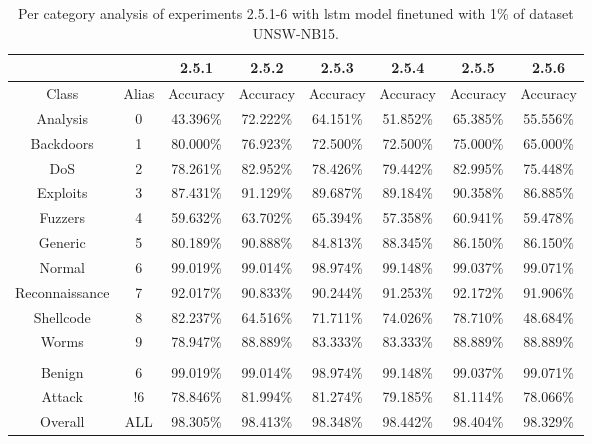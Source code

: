 \begin{table}[htb]
    \centering
    \begin{tabular}{@{}cccccccc@{}}
        \toprule
         &  & 2.5.1 & 2.5.2 & 2.5.3 & 2.5.4 & 2.5.5 & 2.5.6 \\
        \midrule
        Class &  Alias &  Accuracy &  Accuracy &  Accuracy &  Accuracy &  Accuracy &  Accuracy \\
        Analysis &  0 &  43.396\% &  72.222\% &  64.151\% &  51.852\% &  65.385\% &  55.556\% \\
        Backdoors &  1 &  80.000\% &  76.923\% &  72.500\% &  72.500\% &  75.000\% &  65.000\% \\
        DoS &  2 &  78.261\% &  82.952\% &  78.426\% &  79.442\% &  82.995\% &  75.448\% \\
        Exploits &  3 &  87.431\% &  91.129\% &  89.687\% &  89.184\% &  90.358\% &  86.885\% \\
        Fuzzers &  4 &  59.632\% &  63.702\% &  65.394\% &  57.358\% &  60.941\% &  59.478\% \\
        Generic &  5 &  80.189\% &  90.888\% &  84.813\% &  88.345\% &  86.150\% &  86.150\% \\
        Normal &  6 &  99.019\% &  99.014\% &  98.974\% &  99.148\% &  99.037\% &  99.071\% \\
        Reconnaissance &  7 &  92.017\% &  90.833\% &  90.244\% &  91.253\% &  92.172\% &  91.906\% \\
        Shellcode &  8 &  82.237\% &  64.516\% &  71.711\% &  74.026\% &  78.710\% &  48.684\% \\
        Worms &  9 &  78.947\% &  88.889\% &  83.333\% &  83.333\% &  88.889\% &  88.889\% \\
         \\
        Benign &  6 &  99.019\% &  99.014\% &  98.974\% &  99.148\% &  99.037\% &  99.071\% \\
        Attack &  !6 &  78.846\% &  81.994\% &  81.274\% &  79.185\% &  81.114\% &  78.066\% \\
        Overall &  ALL &  98.305\% &  98.413\% &  98.348\% &  98.442\% &  98.404\% &  98.329\% \\
        \bottomrule
    \end{tabular}
    \caption{Per category analysis of experiments 2.5.1-6 with \gls{lstm} model finetuned with 1\% of dataset UNSW-NB15.}
    \label{table:results:lstm:class_flows15_10}
\end{table}